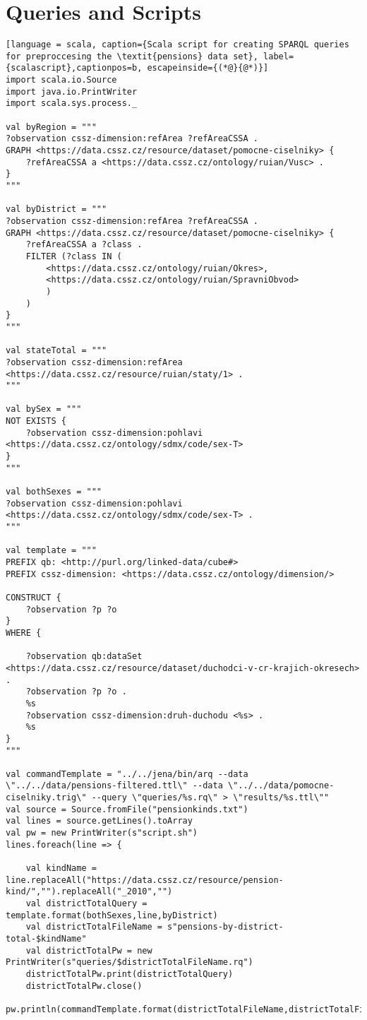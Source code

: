 \chapter{Queries and Scripts}

\begin{lstlisting}[language = scala, caption={Scala script for creating SPARQL queries for preproccesing the \textit{pensions} data set}, label={scalascript},captionpos=b, escapeinside={(*@}{@*)}]
import scala.io.Source
import java.io.PrintWriter
import scala.sys.process._
    
val byRegion = """
?observation cssz-dimension:refArea ?refAreaCSSA .
GRAPH <https://data.cssz.cz/resource/dataset/pomocne-ciselniky> {
    ?refAreaCSSA a <https://data.cssz.cz/ontology/ruian/Vusc> .
}
"""
    
val byDistrict = """
?observation cssz-dimension:refArea ?refAreaCSSA .
GRAPH <https://data.cssz.cz/resource/dataset/pomocne-ciselniky> {
    ?refAreaCSSA a ?class .
    FILTER (?class IN (
        <https://data.cssz.cz/ontology/ruian/Okres>,
        <https://data.cssz.cz/ontology/ruian/SpravniObvod>
        )
    )
}
"""
    
val stateTotal = """
?observation cssz-dimension:refArea <https://data.cssz.cz/resource/ruian/staty/1> .
"""
    
val bySex = """
NOT EXISTS {
    ?observation cssz-dimension:pohlavi <https://data.cssz.cz/ontology/sdmx/code/sex-T>
}
"""
    
val bothSexes = """
?observation cssz-dimension:pohlavi <https://data.cssz.cz/ontology/sdmx/code/sex-T> .
"""
    
val template = """
PREFIX qb: <http://purl.org/linked-data/cube#>
PREFIX cssz-dimension: <https://data.cssz.cz/ontology/dimension/>
    
CONSTRUCT {
    ?observation ?p ?o
}
WHERE {
    
    ?observation qb:dataSet <https://data.cssz.cz/resource/dataset/duchodci-v-cr-krajich-okresech> .
    ?observation ?p ?o .
    %s
    ?observation cssz-dimension:druh-duchodu <%s> .
    %s
}
"""
    
val commandTemplate = "../../jena/bin/arq --data \"../../data/pensions-filtered.ttl\" --data \"../../data/pomocne-ciselniky.trig\" --query \"queries/%s.rq\" > \"results/%s.ttl\""
val source = Source.fromFile("pensionkinds.txt")
val lines = source.getLines().toArray
val pw = new PrintWriter(s"script.sh") 
lines.foreach(line => {
        
    val kindName = line.replaceAll("https://data.cssz.cz/resource/pension-kind/","").replaceAll("_2010","")
    val districtTotalQuery = template.format(bothSexes,line,byDistrict)
    val districtTotalFileName = s"pensions-by-district-total-$kindName"
    val districtTotalPw = new PrintWriter(s"queries/$districtTotalFileName.rq")
    districtTotalPw.print(districtTotalQuery)
    districtTotalPw.close()
    pw.println(commandTemplate.format(districtTotalFileName,districtTotalFileName))
    

\end{lstlisting}
